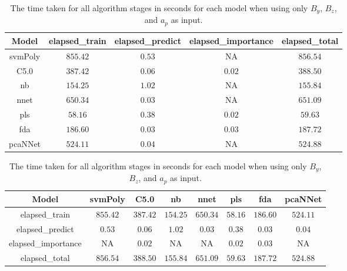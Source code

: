 \begin{table}[!ht]
	\centering
	\begin{tabular}{|c|c|c|c|c|}
		\hline
		Model & elapsed_train & elapsed_predict & elapsed_importance & elapsed_total \\ \hline
		svmPoly & $855.42$ & $0.53$ & NA & $856.54$ \\ \hline
		C5.0 & $387.42$ & $0.06$ & $0.02$ & $388.50$ \\ \hline
		nb & $154.25$ & $1.02$ & NA & $155.84$ \\ \hline
		nnet & $650.34$ & $0.03$ & NA & $651.09$ \\ \hline
		pls & $58.16$ & $0.38$ & $0.02$ & $59.63$ \\ \hline
		fda & $186.60$ & $0.03$ & $0.03$ & $187.72$ \\ \hline
		pcaNNet & $524.11$ & $0.04$ & NA & $524.88$ \\ \hline
	\end{tabular}
	\caption{The time taken for all algorithm stages in seconds for each model when using only $B_{y}$, $B_{z}$, and $a_{p}$ as input.}
	\label{tab:time:yzap}
\end{table}

\begin{table}[!ht]
	\centering
	\begin{tabular}{|c|c|c|c|c|c|c|c|}
		\hline
		Model & svmPoly & C5.0 & nb & nnet & pls & fda & pcaNNet \\ \hline
		elapsed_train & $855.42$ & $387.42$ & $154.25$ & $650.34$ & $58.16$ & $186.60$ & $524.11$ \\ \hline
		elapsed_predict & $0.53$ & $0.06$ & $1.02$ & $0.03$ & $0.38$ & $0.03$ & $0.04$ \\ \hline
		elapsed_importance & NA & $0.02$ & NA & NA & $0.02$ & $0.03$ & NA \\ \hline
		elapsed_total & $856.54$ & $388.50$ & $155.84$ & $651.09$ & $59.63$ & $187.72$ & $524.88$ \\ \hline
	\end{tabular}
	\caption{The time taken for all algorithm stages in seconds for each model when using only $B_{y}$, $B_{z}$, and $a_{p}$ as input.}
	\label{tab:time:reverse:yzap}
\end{table}

